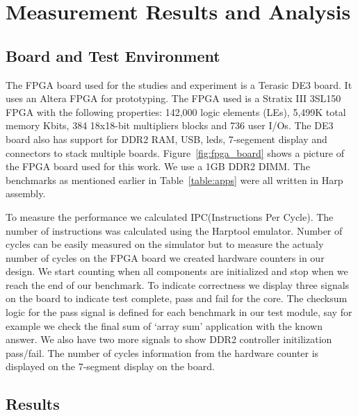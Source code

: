 \setcounter{equation}{0}
 
\chapter{Measurement Results and Analysis}
\label{chap: Simulation Results }
\section{Board and Test Environment}

The FPGA board used for the studies and experiment is a Terasic DE3 board. It uses an Altera FPGA for prototyping. The FPGA used is a Stratix III 3SL150 FPGA with the following properties: 142,000 logic elements (LEs), 5,499K total memory Kbits, 384 18x18-bit multipliers blocks and 736 user I/Os. The DE3 board also has support for DDR2 RAM, USB, leds, 7-segement display and connectors to stack multiple boards. Figure~\ref{fig:fpga_board} shows a picture of the FPGA board used for this work. We use a 1GB DDR2 DIMM. The benchmarks as mentioned earlier in Table~\ref{table:apps} were all written in Harp assembly.

To measure the performance we calculated IPC(Instructions Per Cycle). The number of instructions was calculated using the Harptool emulator. Number of cycles can be easily measured on the simulator but to measure the actualy number of cycles on the FPGA board we created hardware counters in our design. We start counting when all components are initialized and stop when we reach the end of our benchmark. To indicate correctness we display three signals on the board to indicate test complete, pass and fail for the core. The checksum logic for the pass signal is defined for each benchmark in our test module, say for example we check the final sum of `array sum' application with the known answer. We also have two more signals to show DDR2 controller initilization pass/fail. The number of cycles information from the hardware counter is displayed on the 7-segment display on the board.
\section{Results}

